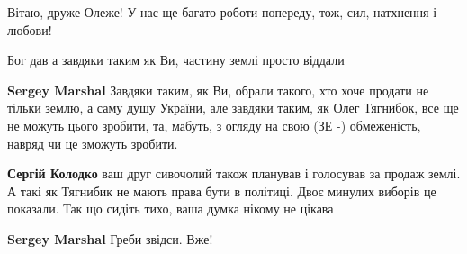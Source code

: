 \begin{itemize}
 
Вітаю, друже Олеже! У нас ще багато роботи попереду, тож, сил, натхнення і любови!

 
Бог дав а завдяки таким як Ви, частину землі просто віддали

\begin{itemize}
 
\textbf{Sergey Marshal} Завдяки таким, як Ви, обрали такого, хто хоче продати не тільки землю, а саму душу України, але завдяки таким, як Олег Тягнибок, все ще не можуть цього зробити, та, мабуть, з огляду на свою (ЗЕ -) обмеженість, навряд чи це зможуть зробити.

 
\textbf{Сергій Колодко} ваш друг сивочолий також планував і голосував за продаж землі. А такі як Тягнибик не мають права бути в політиці. Двоє минулих виборів це показали. Так що сидіть тихо, ваша думка нікому не цікава

 
\textbf{Sergey Marshal} Греби звідси. Вже!

 

\end{itemize}
\end{itemize}
